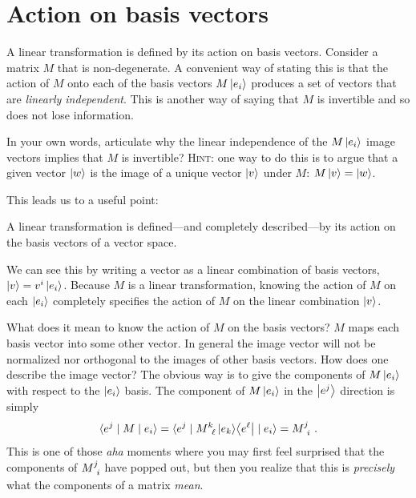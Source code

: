 \documentclass[12pt, oneside]{report}    %
\let\oldsection\section
\def\section{%
  \setcounter{sidenote}{1}%
  \oldsection
}
\begin{document}
\section{Action on basis vectors}

A linear transformation is defined by its action on basis vectors. Consider a matrix $M$ that is non-degenerate. A convenient way of stating this is that the action of $M$ onto each of the basis vectors $M\left|e_i\right\rangle$ produces a set of vectors that are \emph{linearly independent}. This is another way of saying that $M$ is invertible and so does not lose information. 
\begin{exercise}
In your own words, articulate why the linear independence of the $M\left|e_i\right\rangle$ image vectors implies that $M$ is invertible? \textsc{Hint}: one way to do this is to argue that a given vector $\left|w\right\rangle$ is the image of a unique vector $\left|v\right\rangle$ under $M$: $M\left|v\right\rangle = \left|w\right\rangle$.
\end{exercise}

This leads us to a useful point:
\begin{bigidea}
A linear transformation is defined---and completely described---by its action on the basis vectors of a vector space.
\end{bigidea}
We can see this by writing a vector as a linear combination of basis vectors, $\left|v\right\rangle = v^i\left|e_i\right\rangle$. Because $M$ is a linear transformation, knowing the action of $M$ on each $\left|e_i\right\rangle$ completely specifies the action of $M$ on the linear combination $\left|v\right\rangle$. 

What does it mean to know the action of $M$ on the basis vectors? $M$ maps each basis vector into some other vector. In general the image vector will not be normalized nor orthogonal to the images of other basis vectors. How does one describe the image vector? The obvious way is to give the components of $M\left|e_i\right\rangle$ with respect to the $\left|e_i\right\rangle$ basis. The component of $M\left|e_i\right\rangle$ in the $\left|e^j\right\rangle$ direction is simply
\begin{align}
    \la e^j \mid M \mid e_i \ra 
    = 
    \la e^j \mid M\aij{k}{\ell}\ket{e_k}\!\bra{e^\ell} \mid e_i \ra 
    = M\aij{j}{i} \ .
\end{align}
This is one of those \emph{aha} moments where you may first feel surprised that the components of $M\aij{j}{i}$ have popped out, but then you realize that this is \emph{precisely} what the components of a matrix \emph{mean}. 
\end{document}
